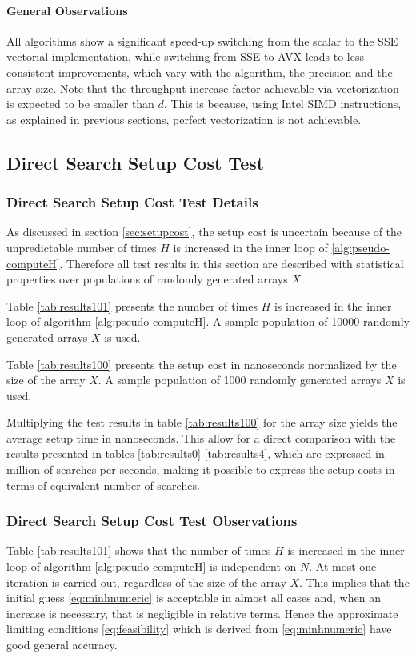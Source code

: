 \documentclass[preprint,1p,times]{elsarticle}
\begin{document}
\paragraph{General Observations}
All algorithms show a significant speed-up switching from the scalar to the SSE vectorial implementation, while switching from SSE to AVX leads to less consistent improvements, which vary with the algorithm, the precision and the array size.
Note that the throughput increase factor achievable via vectorization is expected to be smaller than $d$. This is because, using Intel SIMD instructions, as explained in previous sections, perfect vectorization is not achievable.

\subsection{Direct Search Setup Cost Test}
\label{sec:setuptests}
\subsubsection{Direct Search Setup Cost Test Details}
As discussed in section \ref{sec:setupcost}, the setup cost is uncertain because of the unpredictable number of times $H$ is increased in the inner loop of \ref{alg:pseudo-computeH}. Therefore all test results in this section are described with statistical properties over populations of randomly generated arrays $X$.

Table \ref{tab:results101} presents the number of times $H$ is increased in the inner loop of algorithm \ref{alg:pseudo-computeH}. A sample population of 10000 randomly generated arrays $X$ is used.

Table \ref{tab:results100} presents the setup cost in nanoseconds normalized by the size of the array $X$. A sample population of 1000 randomly generated arrays $X$ is used.

Multiplying the test results in table \ref{tab:results100} for the array size yields the average setup time in nanoseconds. This allow for a direct comparison with the results presented in tables  \ref{tab:results0}-\ref{tab:results4}, which are expressed in million of searches per seconds, making it possible to express the setup costs in terms of equivalent number of searches.

\subsubsection{Direct Search Setup Cost Test Observations}
Table \ref{tab:results101} shows that the number of times $H$ is increased in the inner loop of algorithm \ref{alg:pseudo-computeH} is independent on $N$. At most one iteration is carried out, regardless of the size of the array $X$. This implies that the initial guess \eqref{eq:minhnumeric} is acceptable in almost all cases and, when an increase is necessary, that is negligible in relative terms. Hence the approximate limiting conditions \eqref{eq:feasibility} which is derived from \eqref{eq:minhnumeric} have good general accuracy.
\end{document}
